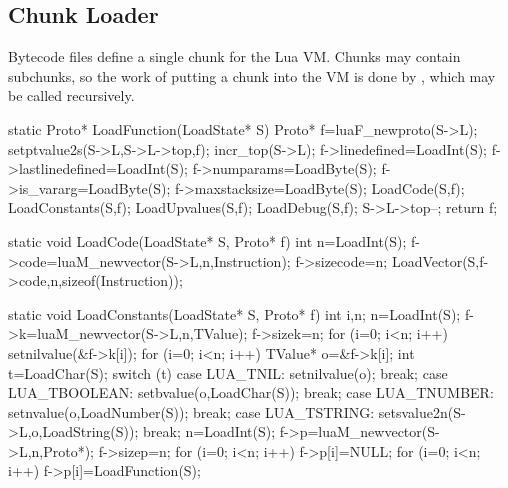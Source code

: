 
\subsection{Chunk Loader}

	Bytecode files define a single chunk for the Lua VM.  Chunks may
	contain subchunks, so the work of putting a chunk into the VM is done
	by , which may be called recursively.


\begin{LuaCCode}[caption=Definition of \func{LoadFunction} from \filename{lundump.c}]
static Proto* LoadFunction(LoadState* S)
{
 Proto* f=luaF_newproto(S->L);
 setptvalue2s(S->L,S->L->top,f); incr_top(S->L);
 f->linedefined=LoadInt(S);
 f->lastlinedefined=LoadInt(S);
 f->numparams=LoadByte(S);
 f->is_vararg=LoadByte(S);
 f->maxstacksize=LoadByte(S);
 LoadCode(S,f);
 LoadConstants(S,f);
 LoadUpvalues(S,f);
 LoadDebug(S,f);
 S->L->top--;
 return f;
}
\end{LuaCCode}


\begin{LuaCCode}[caption=Definition of \func{LoadCode} from \filename{lundump.c}]
static void LoadCode(LoadState* S, Proto* f)
{
 int n=LoadInt(S);
 f->code=luaM_newvector(S->L,n,Instruction);
 f->sizecode=n;
 LoadVector(S,f->code,n,sizeof(Instruction));
}
\end{LuaCCode}


\begin{LuaCCode}[caption=Definition of \func{LoadConstants} from \filename{lundump.c}]
static void LoadConstants(LoadState* S, Proto* f)
{
 int i,n;
 n=LoadInt(S);
 f->k=luaM_newvector(S->L,n,TValue);
 f->sizek=n;
 for (i=0; i<n; i++) setnilvalue(&f->k[i]);
 for (i=0; i<n; i++)
 {
  TValue* o=&f->k[i];
  int t=LoadChar(S);
  switch (t)
  {
   case LUA_TNIL:
	setnilvalue(o);
	break;
   case LUA_TBOOLEAN:
	setbvalue(o,LoadChar(S));
	break;
   case LUA_TNUMBER:
	setnvalue(o,LoadNumber(S));
	break;
   case LUA_TSTRING:
	setsvalue2n(S->L,o,LoadString(S));
	break;
  }
 }
 n=LoadInt(S);
 f->p=luaM_newvector(S->L,n,Proto*);
 f->sizep=n;
 for (i=0; i<n; i++) f->p[i]=NULL;
 for (i=0; i<n; i++) f->p[i]=LoadFunction(S);
}
\end{LuaCCode}

